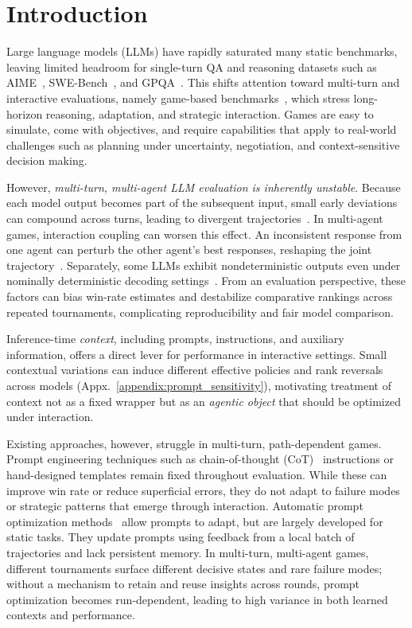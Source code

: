 
\section{Introduction}

Large language models (LLMs) have rapidly saturated many static benchmarks, leaving limited headroom for single-turn QA and reasoning datasets such as AIME~\citep{aime2024}, SWE-Bench~\citep{jimenez2023swe}, and GPQA~\citep{rein2024gpqa}. This shifts attention toward multi-turn and interactive evaluations, namely game-based benchmarks~\citep{duan2024gtbench,topsakal2024evaluating,fan2024can}, which stress long-horizon reasoning, adaptation, and strategic interaction. Games are easy to simulate, come with objectives, and require capabilities that apply to real-world challenges such as planning under uncertainty, negotiation, and context-sensitive decision making.

However, \emph{multi-turn, multi-agent LLM evaluation is inherently unstable}. Because each model output becomes part of the subsequent input, small early deviations can compound across turns, leading to divergent trajectories~\citep{laban2025llms}. In multi-agent games, interaction coupling can worsen this effect. An inconsistent response from one agent can perturb the other agent's best responses, reshaping the joint trajectory~\citep{cemri2025multi}. Separately, some LLMs exhibit nondeterministic outputs even under nominally deterministic decoding settings~\citep{blair2025llms}. From an evaluation perspective, these factors can bias win-rate estimates and destabilize comparative rankings across repeated tournaments, complicating reproducibility and fair model comparison.

Inference-time \emph{context}, including prompts, instructions, and auxiliary information, offers a direct lever for performance in interactive settings. Small contextual variations can induce different effective policies and rank reversals across models (Appx.~\ref{appendix:prompt_sensitivity}), motivating treatment of context not as a fixed wrapper but as an \emph{agentic object} that should be optimized under interaction.

Existing approaches, however, struggle in multi-turn, path-dependent games. Prompt engineering techniques such as chain-of-thought (CoT)~\citep{wei2022chain} instructions or hand-designed templates remain fixed throughout evaluation. While these can improve win rate or reduce superficial errors, they do not adapt to failure modes or strategic patterns that emerge through interaction. Automatic prompt optimization methods~\citep{yuksekgonul2024textgrad,yin2025llm,agrawal2025gepa,opsahl2024optimizing} allow prompts to adapt, but are largely developed for static tasks. They update prompts using feedback from a local batch of trajectories and lack persistent memory. In multi-turn, multi-agent games, different tournaments surface different decisive states and rare failure modes; without a mechanism to retain and reuse insights across rounds, prompt optimization becomes run-dependent, leading to high variance in both learned contexts and performance.

